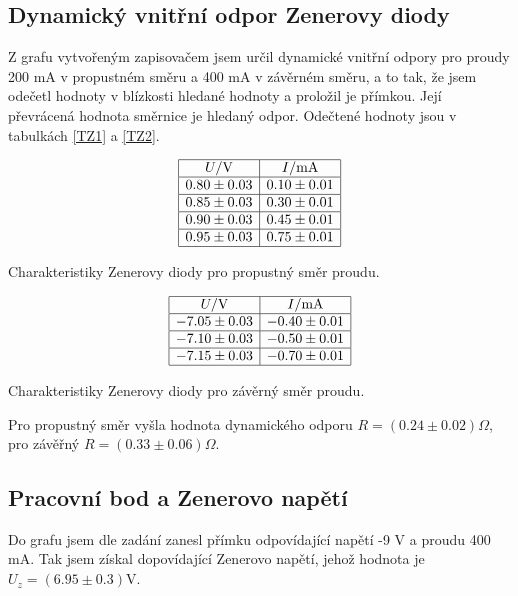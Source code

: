 \documentclass[a4paper,12pt]{article}
\begin{document}
\subsection{Dynamický vnitřní odpor Zenerovy diody}
Z grafu vytvořeným zapisovačem jsem určil dynamické vnitřní odpory pro proudy 200 mA v propustném směru a 400 mA v závěrném směru, a to tak, že jsem 
odečetl hodnoty v blízkosti hledané hodnoty a proložil je přímkou. Její převrácená hodnota směrnice je hledaný odpor. Odečtené hodnoty jsou v tabulkách \ref{TZ1} a \ref{TZ2}.
\begin{table}
$$
\begin{array}{|c|c|}
\hline
U/\mbox{V}& I/\mbox{mA} \\ \hline
0.80 \pm 0.03&  0.10 \pm 0.01 \\ \hline
0.85 \pm 0.03&  0.30 \pm 0.01 \\ \hline
0.90 \pm 0.03&  0.45 \pm 0.01 \\ \hline
0.95 \pm 0.03&  0.75 \pm 0.01 \\ \hline
\end{array}
$$
\caption{Charakteristiky Zenerovy diody pro propustný směr proudu.}
\label{TZ1}
\end{table}
\begin{table}
$$
\begin{array}{|c|c|}
\hline
U/\mbox{V}& I/\mbox{mA} \\ \hline
-7.05 \pm 0.03&  -0.40 \pm 0.01 \\ \hline
-7.10 \pm 0.03&  -0.50 \pm 0.01 \\ \hline
-7.15 \pm 0.03&  -0.70 \pm 0.01 \\ \hline
\end{array}
$$
\caption{Charakteristiky Zenerovy diody pro závěrný směr proudu.}
\label{TZ2}
\end{table}

Pro propustný směr vyšla hodnota dynamického odporu $R=(0.24\pm0.02)\Omega$, pro závěřný 
$R=(0.33\pm0.06)\Omega$.

\subsection{Pracovní bod a Zenerovo napětí}
Do grafu jsem dle zadání zanesl přímku odpovídající napětí -9 V a proudu 400 mA. Tak jsem získal 
dopovídající Zenerovo napětí, jehož hodnota je $U_z=(6.95\pm0.3)\mbox{V}$.
\end{document}

